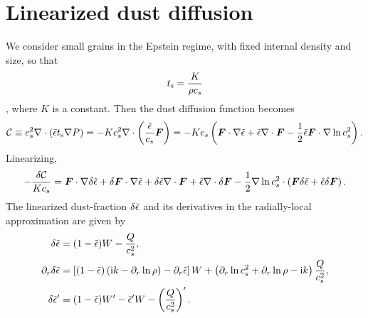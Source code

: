 \section{Linearized dust diffusion}\label{lin_dust}
We consider small grains in the Epstein regime, with fixed internal
density and size, so that
\begin{align}
  t_\mathrm{s}  =  \frac{K}{\rho c_s}
\end{align}
\citep{price15}, where $K$ is a constant. Then the dust diffusion
function becomes
\begin{align}
  \mathcal{C} \equiv c_s^2\nabla\cdot\left(\tilde{\epsilon}t_\mathrm{s}\nabla
  P\right) = - K c_s^2 \nabla\cdot
  \left(\frac{\tilde{\epsilon}}{c_s}\bm{F}\right) =
  -Kc_s \left(\bm{F}\cdot\nabla\tilde{\epsilon} + \tilde{\epsilon} \nabla\cdot\bm{F}
  - \frac{1}{2}\tilde{\epsilon}\bm{F}\cdot\nabla\ln{c_s^2}\right).  
\end{align}
Linearizing,
\begin{align}
  - \frac{\delta\mathcal{C}}{Kc_s} = \bm{F}\cdot\nabla\delta\tilde{\epsilon} +
  \delta\bm{F}\cdot\nabla\tilde{\epsilon} + \delta\tilde{\epsilon}\nabla\cdot\bm{F} +
  \tilde{\epsilon}\nabla\cdot\delta\bm{F} -
  \frac{1}{2}\nabla\ln{c_s^2}\cdot\left(\bm{F}\delta\tilde{\epsilon} + \tilde{\epsilon}
  \delta\bm{F}\right). 
\end{align}
The linearized dust-fraction $\delta\tilde{\epsilon}$ and its derivatives in the
radially-local approximation are given by
\begin{align}
  \delta\tilde{\epsilon}      &= (1-\tilde{\epsilon})W - \frac{Q}{c_s^2}, \\
  \partial_r\delta\tilde{\epsilon} &= \left[(1-\tilde{\epsilon})\left(\mathrm{i} k -
    \partial_r\ln{\rho}\right) - \partial_r\tilde{\epsilon}\right]W + \left(\partial_r\ln{c_s^2}
  + \partial_r\ln{\rho} - \mathrm{i} k \right)\frac{Q}{c_s^2},\\
  \delta\tilde{\epsilon}^\prime &= (1-\tilde{\epsilon})W^\prime - \tilde{\epsilon}^\prime W -
  \left(\frac{Q}{c_s^2}\right)^\prime. 
\end{align}



